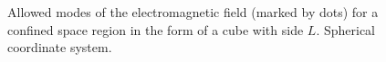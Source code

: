 \begin{figure}
\centering

\caption{Allowed modes of the electromagnetic field (marked by dots) for a confined
  space region in the form of a cube with side $L$. Spherical
  coordinate system.}
\label{figCh1_pic4}
\end{figure}